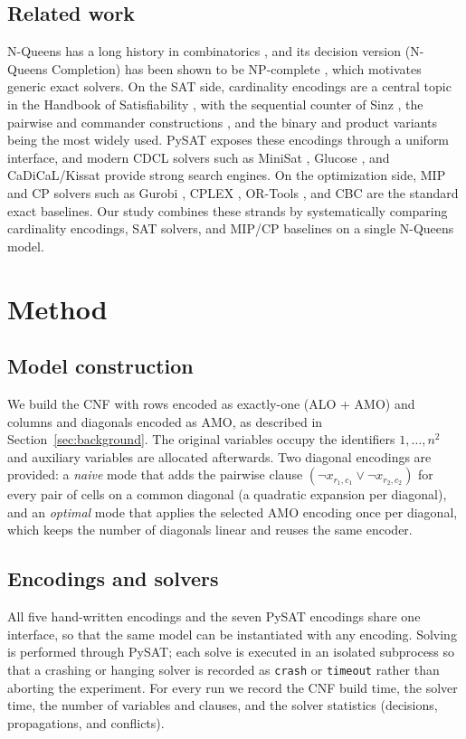 \documentclass[a4paper,fleqn]{cas-sc}
\begin{document}
\subsection{Related work}
N-Queens has a long history in combinatorics \citep{BellStevens2009}, and its
decision version (N-Queens Completion) has been shown to be NP-complete
\citep{Gent2017}, which motivates generic exact solvers. On the SAT side,
cardinality encodings are a central topic in the Handbook of Satisfiability
\citep{Biere2021,Prestwich2009}, with the sequential counter of Sinz
\citep{Sinz2005}, the pairwise and commander constructions
\citep{KlieberKwon2007}, and the binary and product variants
\citep{FrischGiannaros2010} being the most widely used. PySAT
\citep{Ignatiev2018} exposes these encodings through a uniform interface, and
modern CDCL solvers such as MiniSat \citep{EenSorensson2003}, Glucose
\citep{AudemardSimon2009}, and CaDiCaL/Kissat \citep{Biere2020} provide strong
search engines. On the optimization side, MIP and CP solvers such as Gurobi
\citep{Gurobi2024}, CPLEX \citep{IBM2022}, OR-Tools \citep{ORtools2023}, and CBC
\citep{ForrestCBC} are the standard exact baselines. Our study combines these
strands by systematically comparing cardinality encodings, SAT solvers, and
MIP/CP baselines on a single N-Queens model.

\section{Method}\label{sec:method}

\subsection{Model construction}
We build the CNF with rows encoded as exactly-one (ALO + AMO) and columns and
diagonals encoded as AMO, as described in Section~\ref{sec:background}. The
original variables occupy the identifiers $1,\dots,n^2$ and auxiliary variables
are allocated afterwards. Two diagonal encodings are provided: a \emph{naive}
mode that adds the pairwise clause $(\neg x_{r_1,c_1} \vee \neg x_{r_2,c_2})$ for
every pair of cells on a common diagonal (a quadratic expansion per diagonal),
and an \emph{optimal} mode that applies the selected AMO encoding once per
diagonal, which keeps the number of diagonals linear and reuses the same encoder.

\subsection{Encodings and solvers}
All five hand-written encodings and the seven PySAT encodings share one
interface, so that the same model can be instantiated with any encoding. Solving
is performed through PySAT; each solve is executed in an isolated subprocess so
that a crashing or hanging solver is recorded as \texttt{crash} or
\texttt{timeout} rather than aborting the experiment. For every run we record the
CNF build time, the solver time, the number of variables and clauses, and the
solver statistics (decisions, propagations, and conflicts).
\end{document}
